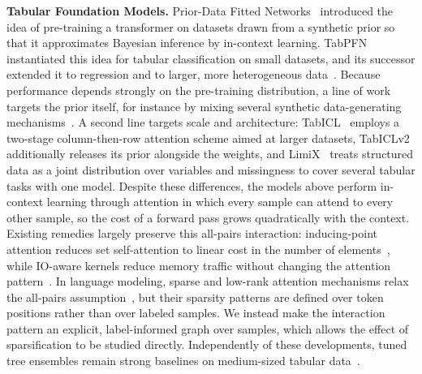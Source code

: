 \documentclass{article} %
\begin{document}
\textbf{Tabular Foundation Models.} Prior-Data Fitted Networks~\citep{muller2022transformers} introduced the idea of pre-training a transformer on datasets drawn from a synthetic prior so that it approximates Bayesian inference by in-context learning. TabPFN~\citep{hollmann2023tabpfn} instantiated this idea for tabular classification on small datasets, and its successor extended it to regression and to larger, more heterogeneous data~\citep{hollmann2025accurate}. Because performance depends strongly on the pre-training distribution, a line of work targets the prior itself, for instance by mixing several synthetic data-generating mechanisms~\citep{zhang2025mitra}. A second line targets scale and architecture: TabICL~\citep{qu2025tabicl} employs a two-stage column-then-row attention scheme aimed at larger datasets, TabICLv2~\citep{qu2026tabiclv2} additionally releases its prior alongside the weights, and LimiX~\citep{zhang2025limixunleashingstructureddatamodeling} treats structured data as a joint distribution over variables and missingness to cover several tabular tasks with one model. Despite these differences, the models above perform in-context learning through attention in which every sample can attend to every other sample, so the cost of a forward pass grows quadratically with the context. Existing remedies largely preserve this all-pairs interaction: inducing-point attention reduces set self-attention to linear cost in the number of elements~\citep{lee2019set}, while IO-aware kernels reduce memory traffic without changing the attention pattern~\citep{dao2022flashattention}. In language modeling, sparse and low-rank attention mechanisms relax the all-pairs assumption~\citep{zaheer2020bigbird, beltagy2020longformer, choromanski2021rethinking}, but their sparsity patterns are defined over token positions rather than over labeled samples. We instead make the interaction pattern an explicit, label-informed graph over samples, which allows the effect of sparsification to be studied directly. Independently of these developments, tuned tree ensembles remain strong baselines on medium-sized tabular data~\citep{grinsztajn2022why_do_tree_models}.
\end{document}
